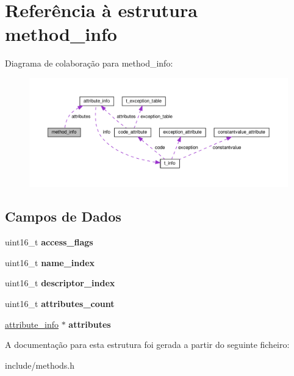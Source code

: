 \hypertarget{structmethod__info}{}\section{Referência à estrutura method\+\_\+info}
\label{structmethod__info}


Diagrama de colaboração para method\+\_\+info\+:\nopagebreak
\begin{figure}[H]
\begin{center}
\leavevmode
\includegraphics[width=350pt]{structmethod__info__coll__graph}
\end{center}
\end{figure}
\subsection*{Campos de Dados}
\begin{DoxyCompactItemize}
\item 
\mbox{\label{structmethod__info_a8fc68aba419f2617deda879c467f5410}} 
uint16\+\_\+t {\bfseries access\+\_\+flags}
\item 
\mbox{\label{structmethod__info_af0ba3d6d566432e74eed5c37cd998c14}} 
uint16\+\_\+t {\bfseries name\+\_\+index}
\item 
\mbox{\label{structmethod__info_abccd6a5202d4c0ee1be6b89692d0352a}} 
uint16\+\_\+t {\bfseries descriptor\+\_\+index}
\item 
\mbox{\label{structmethod__info_a9e711e4dfb8181f7dce16c6f640ba734}} 
uint16\+\_\+t {\bfseries attributes\+\_\+count}
\item 
\mbox{\label{structmethod__info_a8ce4caaa03680c91f548558a38647ad8}} 
\hyperlink{structattribute__info}{attribute\+\_\+info} $\ast$ {\bfseries attributes}
\end{DoxyCompactItemize}


A documentação para esta estrutura foi gerada a partir do seguinte ficheiro\+:\begin{DoxyCompactItemize}
\item 
include/methods.\+h\end{DoxyCompactItemize}
